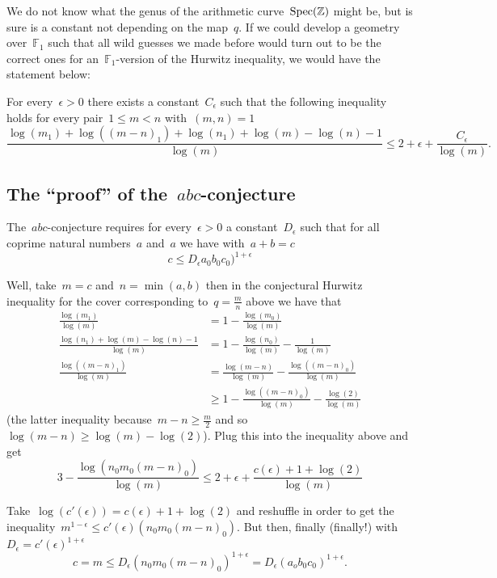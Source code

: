 We do not know what the genus of the arithmetic curve~$\operatorname{Spec}(\mathbb{Z})$ might be, but is sure is a constant not depending on the map~$q$. If we could develop a geometry over~$\mathbb{F}_1$ such that all wild guesses we made before would turn out to be the correct ones for an~$\mathbb{F}_1$-version of the Hurwitz inequality, we would have the statement below:

For every~$\epsilon > 0$ there exists a constant~$C_\epsilon$ such that the following inequality holds for every pair~$1 \leq m < n$ with~$(m,n)=1$
\begin{equation}
  \frac{\log(m_1) + \log((m-n)_1) + \log(n_1) + \log(m)-\log(n)-1}{\log(m)} \leq 2 + \epsilon + \frac{C_\epsilon}{\log(m)}.
\end{equation}

\subsection{The ``proof'' of the~$abc$-conjecture}

The~$abc$-conjecture requires for every~$\epsilon > 0$ a constant~$D_\epsilon$ such that for all coprime natural numbers~$a$ and~$a$ we have with~$a+b=c$
\begin{equation}
c \leq D_\epsilon a_0b_0c_0)^{1+\epsilon}
\end{equation}

Well, take~$m=c$ and~$n=\min(a,b)$ then in the conjectural Hurwitz inequality for the cover corresponding to~$q=\frac{m}{n}$ above we have that
\begin{equation}
  \begin{aligned}
    \frac{\log(m_1)}{\log(m)} &= 1 - \frac{\log(m_0)}{\log(m)} \\
    \frac{\log(n_1)+\log(m)-\log(n)-1}{\log(m)} &= 1 - \frac{\log(n_0)}{\log(m)} - \frac{1}{\log(m)} \\
    \frac{\log((m-n)_1)}{\log(m)}&=\frac{\log(m-n)}{\log(m)}-\frac{\log((m-n)_0)}{\log(m)} \\
    &\geq 1 - \frac{\log((m-n)_0)}{\log(m)} - \frac{\log(2)}{\log(m)}
  \end{aligned}
\end{equation}
(the latter inequality because~$m-n \geq \frac{m}{2}$ and so~$\log(m-n) \geq \log(m)-\log(2)$). Plug this into the inequality above and get
\begin{equation}
  3-\frac{\log(n_0m_0(m-n)_0)}{\log(m)} \leq 2 + \epsilon + \frac{c(\epsilon) + 1 + \log(2)}{\log(m)}
\end{equation}

Take~$\log(c'(\epsilon))=c(\epsilon)+1+\log(2)$ and reshuffle in order to get the inequality~$m^{1-\epsilon} \leq c'(\epsilon)(n_0m_0(m-n)_0)$. But then, finally (finally!) with~$D_\epsilon=c'(\epsilon)^{1+\epsilon}$
\begin{equation}
  c=m \leq D_\epsilon(n_0m_0(m-n)_0)^{1+\epsilon} = D_\epsilon(a_ob_0c_0)^{1+\epsilon}.
\end{equation}
